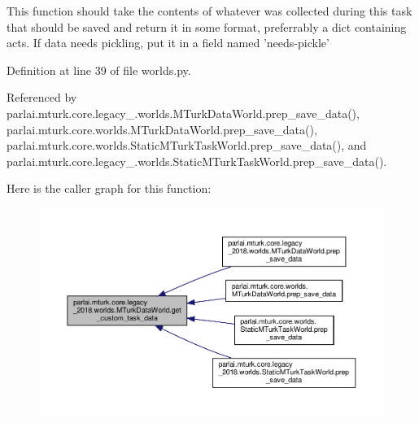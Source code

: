 \begin{DoxyVerb}This function should take the contents of whatever was collected
during this task that should be saved and return it in some format,
preferrably a dict containing acts. If data needs pickling, put it
in a field named 'needs-pickle'\end{DoxyVerb}
 

Definition at line 39 of file worlds.\+py.



Referenced by parlai.\+mturk.\+core.\+legacy\+\_.\+worlds.\+M\+Turk\+Data\+World.\+prep\+\_\+save\+\_\+data(), parlai.\+mturk.\+core.\+worlds.\+M\+Turk\+Data\+World.\+prep\+\_\+save\+\_\+data(), parlai.\+mturk.\+core.\+worlds.\+Static\+M\+Turk\+Task\+World.\+prep\+\_\+save\+\_\+data(), and parlai.\+mturk.\+core.\+legacy\+\_.\+worlds.\+Static\+M\+Turk\+Task\+World.\+prep\+\_\+save\+\_\+data().

Here is the caller graph for this function\+:
\nopagebreak
\begin{figure}[H]
\begin{center}
\leavevmode
\includegraphics[width=350pt]{classparlai_1_1mturk_1_1core_1_1legacy__2018_1_1worlds_1_1MTurkDataWorld_a834f25dbb19035fa683d78980e9493c4_icgraph}
\end{center}
\end{figure}
\mbox{\label{classparlai_1_1mturk_1_1core_1_1legacy__2018_1_1worlds_1_1MTurkDataWorld_ab0fd2eeab0ed799e565c5e97694cd135}} 
